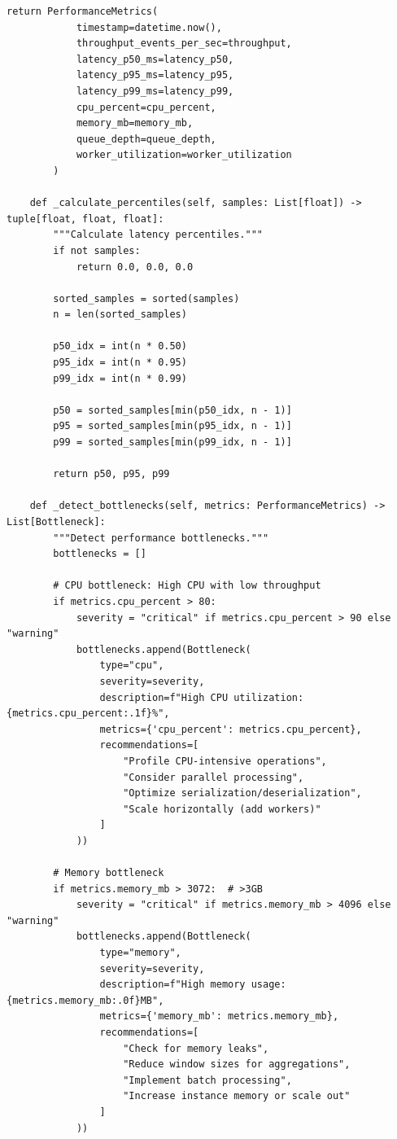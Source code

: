 \begin{lstlisting}[style=python, caption={Performance Monitor with Bottleneck Detection}]
        return PerformanceMetrics(
            timestamp=datetime.now(),
            throughput_events_per_sec=throughput,
            latency_p50_ms=latency_p50,
            latency_p95_ms=latency_p95,
            latency_p99_ms=latency_p99,
            cpu_percent=cpu_percent,
            memory_mb=memory_mb,
            queue_depth=queue_depth,
            worker_utilization=worker_utilization
        )

    def _calculate_percentiles(self, samples: List[float]) -> tuple[float, float, float]:
        """Calculate latency percentiles."""
        if not samples:
            return 0.0, 0.0, 0.0

        sorted_samples = sorted(samples)
        n = len(sorted_samples)

        p50_idx = int(n * 0.50)
        p95_idx = int(n * 0.95)
        p99_idx = int(n * 0.99)

        p50 = sorted_samples[min(p50_idx, n - 1)]
        p95 = sorted_samples[min(p95_idx, n - 1)]
        p99 = sorted_samples[min(p99_idx, n - 1)]

        return p50, p95, p99

    def _detect_bottlenecks(self, metrics: PerformanceMetrics) -> List[Bottleneck]:
        """Detect performance bottlenecks."""
        bottlenecks = []

        # CPU bottleneck: High CPU with low throughput
        if metrics.cpu_percent > 80:
            severity = "critical" if metrics.cpu_percent > 90 else "warning"
            bottlenecks.append(Bottleneck(
                type="cpu",
                severity=severity,
                description=f"High CPU utilization: {metrics.cpu_percent:.1f}%",
                metrics={'cpu_percent': metrics.cpu_percent},
                recommendations=[
                    "Profile CPU-intensive operations",
                    "Consider parallel processing",
                    "Optimize serialization/deserialization",
                    "Scale horizontally (add workers)"
                ]
            ))

        # Memory bottleneck
        if metrics.memory_mb > 3072:  # >3GB
            severity = "critical" if metrics.memory_mb > 4096 else "warning"
            bottlenecks.append(Bottleneck(
                type="memory",
                severity=severity,
                description=f"High memory usage: {metrics.memory_mb:.0f}MB",
                metrics={'memory_mb': metrics.memory_mb},
                recommendations=[
                    "Check for memory leaks",
                    "Reduce window sizes for aggregations",
                    "Implement batch processing",
                    "Increase instance memory or scale out"
                ]
            ))


\end{lstlisting}

